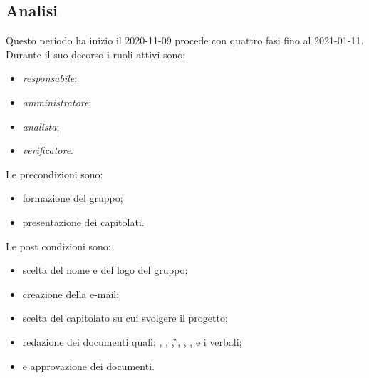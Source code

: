 \subsection{Analisi}
Questo periodo ha inizio il 2020-11-09 procede con quattro fasi fino al 2021-01-11.
Durante il suo decorso i ruoli attivi sono:
\begin{itemize}
\item \textit{responsabile};
\item \textit{amministratore};
\item \textit{analista};
\item \textit{verificatore}.
\end{itemize}
Le precondizioni sono:
\begin{itemize}
	\item formazione del gruppo;
	\item presentazione dei capitolati.
\end{itemize}
Le post condizioni sono:
\begin{itemize}
	\item scelta del nome e del logo del gruppo;
	\item creazione della e-mail;
	\item scelta del capitolato su cui svolgere il progetto;
	\item redazione dei documenti quali: \SdF{}, \NdP{}, \PdP{}, \G{}, \LdP{}, \PdQ{}, \AdR{} e i verbali;
	\item {} e approvazione dei documenti.
\end{itemize}
